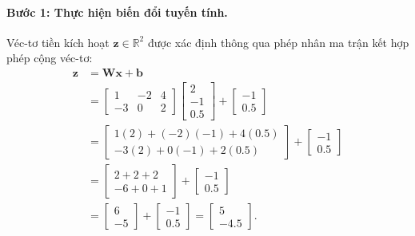 \paragraph{Bước 1: Thực hiện biến đổi tuyến tính.\\}
Véc-tơ tiền kích hoạt $\mathbf{z} \in \mathbb{R}^2$ được xác định thông qua phép nhân ma trận kết hợp phép cộng véc-tơ:
\[\begin{aligned}
\mathbf{z} &= \mathbf{W}\mathbf{x} + \mathbf{b} \\[3pt]
&= \begin{bmatrix} 1 & -2 & 4 \\ -3 & 0 & 2 \end{bmatrix} \begin{bmatrix} 2 \\ -1 \\ 0.5 \end{bmatrix} + \begin{bmatrix} -1 \\ 0.5 \end{bmatrix} \\[3pt]
&= \begin{bmatrix} 1(2) + (-2)(-1) + 4(0.5) \\ -3(2) + 0(-1) + 2(0.5) \end{bmatrix} + \begin{bmatrix} -1 \\ 0.5 \end{bmatrix} \\[3pt]
&= \begin{bmatrix} 2 + 2 + 2 \\ -6 + 0 + 1 \end{bmatrix} + \begin{bmatrix} -1 \\ 0.5 \end{bmatrix} \\[3pt]
&= \begin{bmatrix} 6 \\ -5 \end{bmatrix} + \begin{bmatrix} -1 \\ 0.5 \end{bmatrix} = \begin{bmatrix} 5 \\ -4.5 \end{bmatrix}.
\end{aligned}\]

